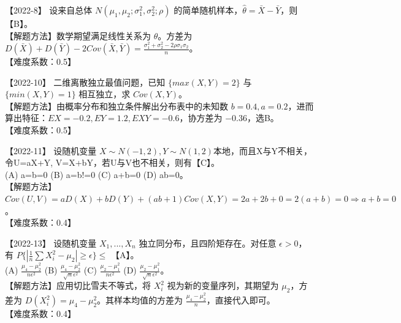 \documentclass[zihao=4, a4paper, fontset=mac]{ctexart}
\begin{document}
\par\vspace{\baselineskip}

【2022-8】 设来自总体 $N(\mu_1,\mu_2;\sigma_1^2,\sigma_2^2;\rho)$ 的简单随机样本，$\hat{\theta}=\bar{X}-\bar{Y}$，则【B】。\\
【解题方法】数学期望满足线性关系为 $\theta$。方差为 $D(\bar{X})+D(\bar{Y})-2Cov(\bar{X},\bar{Y}) = \frac{\sigma_1^2+\sigma_2^2-2\rho\sigma_1\sigma_2}{n}$。\\
【难度系数：0.5】

\par\vspace{\baselineskip}

【2022-10】 二维离散独立最值问题，已知 $\{max(X,Y)=2\}$ 与 $\{min(X,Y)=1\}$ 相互独立，求 $Cov(X,Y)$。\\
【解题方法】由概率分布和独立条件解出分布表中的未知数 $b=0.4, a=0.2$，进而算出特征：$EX=-0.2, EY=1.2, EXY=-0.6$，协方差为 $-0.36$，选B。\\
【难度系数：0.5】

\par\vspace{\baselineskip}

【2022-11】 设随机变量 $X\sim N(-1,2), Y\sim N(1,2)$本地，而且X与Y不相关，令U=aX+Y, V=X+bY，若U与V也不相关，则有【C】。\\
(A) a=b=0 \quad (B) a=b!=0 \quad (C) a+b=0 \quad (D) ab=0。\\
【解题方法】$Cov(U,V)=aD(X)+bD(Y)+(ab+1)Cov(X,Y) = 2a+2b+0 = 2(a+b)=0 \Rightarrow a+b=0$。\\
【难度系数：0.4】

\par\vspace{\baselineskip}

【2022-13】 设随机变量 $X_1,...,X_n$ 独立同分布，且四阶矩存在。对任意 $\epsilon>0$，有 $P\{|\frac{1}{n}\sum X_i^2 - \mu_2|\ge\epsilon\}\le$ 【A】。\\
(A) $\frac{\mu_4-\mu_2^2}{n\epsilon^2}$ \quad (B) $\frac{\mu_4-\mu_2^2}{\sqrt{n}\epsilon^2}$ \quad (C) $\frac{\mu_2-\mu_1^2}{n\epsilon^2}$ \quad (D) $\frac{\mu_2-\mu_1^2}{\sqrt{n}\epsilon^2}$。\\
【解题方法】应用切比雪夫不等式，将 $X_i^2$ 视为新的变量序列，其期望为 $\mu_2$，方差为 $D(X_i^2)=\mu_4-\mu_2^2$。其样本均值的方差为 $\frac{\mu_4-\mu_2^2}{n}$，直接代入即可。\\
【难度系数：0.4】

\par\vspace{\baselineskip}
\end{document}
